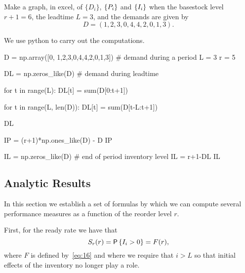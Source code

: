 \begin{exercise}\label{ex:5}
Make a graph, in excel, of $\{D_i\}$, $\{P_i\}$ and $\{I_i\}$ when the basestock level $r+1=6$, the leadtime $L=3$, and the demands are given by
\begin{equation*}
  D = (1,2,3,0,4,4,2,0,1,3).
\end{equation*}
\begin{solution}
We use python to carry out the computations.
\begin{pyconsole}
D = np.array([0, 1,2,3,0,4,4,2,0,1,3]) # demand during a period
L = 3 
r = 5 

DL = np.zeros_like(D) # demand during leadtime

for t in range(L):
    DL[t] = sum(D[0:t+1])

for t in range(L, len(D)):
    DL[t] = sum(D[t-L:t+1])

DL

IP = (r+1)*np.ones_like(D) - D
IP

IL = np.zeros_like(D) # end of period inventory level
IL = r+1-DL
IL
\end{pyconsole}
% 
\end{solution}
\end{exercise}




\begin{comment}
  Exercises on systems with loss
\end{comment}


\subsection{Analytic Results}

In this section we establish a set of formulas by which we can compute several performance measures as a function of the reorder level $r$. 

First, for the ready rate we have that
\begin{equation}
  \label{eq:13}
   S_r(r) = \P{\IL_i > 0} = F(r),
\end{equation}
where $F$ is defined by~\eqref{eq:16} and where we require that $i>L$ so that initial effects of the inventory no longer play a role. 


